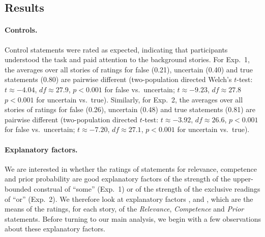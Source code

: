 \documentclass[12pt]{article}
\begin{document}
\subsection*{Results}

\paragraph{Controls.} Control statements were rated as expected, indicating that participants
understood the task and paid attention to the background stories. For Exp.~1, the averages over
all stories of ratings for false (0.21), uncertain (0.40) and true statements (0.80) are
pairwise different (two-population directed Welch's $t$-test: $t \approx - 4.04$,
$df \approx 27.9$, $p < 0.001$ for false vs.~uncertain; $t \approx - 9.23$, $df \approx 27.8$
$p < 0.001$ for uncertain vs.~true). Similarly, for Exp.~2, the averages over all stories of
ratings for false (0.26), uncertain (0.48) and true statements (0.81) are pairwise different
(two-population directed $t$-test: $t \approx - 3.92$, $df \approx 26.6$, $p < 0.001$ for false
vs.~uncertain; $t \approx - 7.20$, $df \approx 27.1$, $p < 0.001$ for uncertain vs.~true).

\paragraph{Explanatory factors.} We are interested in whether the ratings of statements for
relevance, competence and prior probability are good explanatory factors of the strength of
the upper-bounded construal of ``some'' (Exp.~1) or of the strength of the exclusive readings of ``or'' (Exp.~2). We
therefore look at explanatory factors \rel, \com and \pri, which are the means of the ratings,
for each story, of the \emph{Relevance}, \emph{Competence} and \emph{Prior} statements. Before
turning to our main analysis, we begin with a few observations about these explanatory factors.
\end{document}
